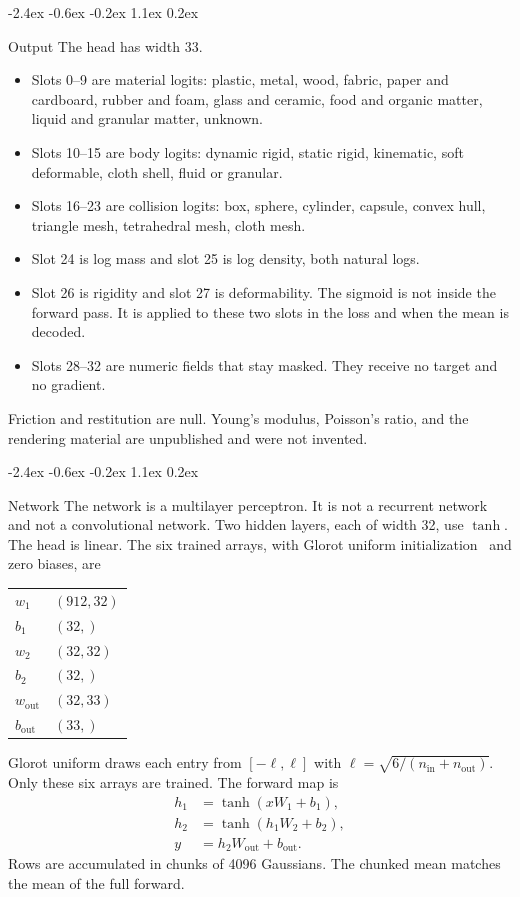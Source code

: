 \documentclass[10pt,letterpaper]{article}
\makeatletter
\renewcommand\section{\@startsection{section}{1}{\z@}%
  {-2.4ex \@plus -0.6ex \@minus -0.2ex}%
  {1.1ex \@plus 0.2ex}%
  {\large\bfseries\raggedright}}
\DeclareRobustCommand{\_}{\textunderscore\allowbreak}
\makeatother
\begin{document}
\section{Output}
The head has width 33.
\begin{itemize}
\item Slots 0--9 are material logits: plastic, metal, wood, fabric, paper and cardboard, rubber and foam, glass and ceramic, food and organic matter, liquid and granular matter, unknown.
\item Slots 10--15 are body logits: dynamic rigid, static rigid, kinematic, soft deformable, cloth shell, fluid or granular.
\item Slots 16--23 are collision logits: box, sphere, cylinder, capsule, convex hull, triangle mesh, tetrahedral mesh, cloth mesh.
\item Slot 24 is log mass and slot 25 is log density, both natural logs.
\item Slot 26 is rigidity and slot 27 is deformability.
The sigmoid is not inside the forward pass.
It is applied to these two slots in the loss and when the mean is decoded.
\item Slots 28--32 are numeric fields that stay masked.
They receive no target and no gradient.
\end{itemize}
Friction and restitution are null.
Young's modulus, Poisson's ratio, and the rendering material are unpublished and were not invented.

\section{Network}
The network is a multilayer perceptron.
It is not a recurrent network and not a convolutional network.
Two hidden layers, each of width 32, use \(\tanh\).
The head is linear.
The six trained arrays, with Glorot uniform initialization~\cite{glorot2010understanding} and zero biases, are
\begin{center}
\begin{tabular}{ll}
\(w_1\) & \((912, 32)\) \\
\(b_1\) & \((32,)\) \\
\(w_2\) & \((32, 32)\) \\
\(b_2\) & \((32,)\) \\
\(w_{\mathrm{out}}\) & \((32, 33)\) \\
\(b_{\mathrm{out}}\) & \((33,)\) \\
\end{tabular}
\end{center}
Glorot uniform draws each entry from \([-\ell, \ell]\) with \(\ell = \sqrt{6/(n_{\mathrm{in}}+n_{\mathrm{out}})}\).
Only these six arrays are trained.
The forward map is
\begin{align*}
h_1 &= \tanh(x W_1 + b_1), \\
h_2 &= \tanh(h_1 W_2 + b_2), \\
y &= h_2 W_{\mathrm{out}} + b_{\mathrm{out}}.
\end{align*}
Rows are accumulated in chunks of 4096 Gaussians.
The chunked mean matches the mean of the full forward.
\end{document}
